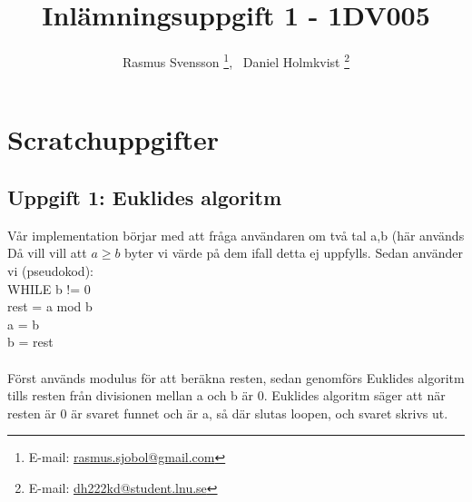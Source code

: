 \documentclass[12pt,a4paper]{article}
\begin{document}
\author{Rasmus Svensson%
  \thanks{E-mail: \href{mailto:rasmus.sjobol@gmail.com}{rasmus.sjobol@gmail.com}}, \ {Daniel Holmkvist%
  \thanks{E-mail: \href{mailto:dh222kd@student.lnu.se}{dh222kd@student.lnu.se}}}}
\title{Inlämningsuppgift 1 - 1DV005}
\maketitle
\tableofcontents
\newpage
\section{Scratchuppgifter}
\subsection{Uppgift 1: Euklides algoritm} 
Vår implementation börjar med att fråga användaren om två tal a,b (här används  Då vill vill att $ a \geq b$ byter vi värde på dem ifall detta ej uppfylls. Sedan använder vi (pseudokod): \\
WHILE b != 0         \\
 	rest = a mod b \\
	a = b \\
	b = rest \\ \\
Först används modulus för att beräkna resten, sedan genomförs Euklides algoritm tills resten från divisionen mellan a och b är 0. Euklides algoritm säger att när resten är 0 är svaret funnet och är a, så där slutas loopen, och svaret skrivs ut. \\
\end{document}
